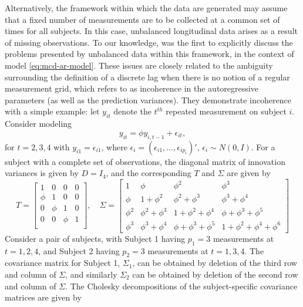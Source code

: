 Alternatively, the framework within which the data are generated may assume that a fixed number of measurements are to be collected at a common set of times for all subjects. In this case, unbalanced longitudinal data arises as a result of missing observations. To our knowledge, \cite{huang2012cautionary} was the first to explicitly discuss the problems presented by unbalanced data within this framework, in the context of model \eqref{eq:mcd-ar-model}. These issues are closely related to the ambiguity surrounding the definition of a discrete lag when there is no notion of a regular measurement grid, which \cite{huang2012cautionary} refers to as incoherence in the autoregressive parameters (as well as the prediction variances). They demonstrate incoherence with a simple example: let $y_{it}$ denote the $t^{th}$ repeated measurement on subject $i$. Consider modeling 
\begin{equation}
y_{it} = \phi y_{i,t-1} + \epsilon_{it},
\end{equation}
\noindent
for $t = 2,3,4$ with $y_{i1} = \epsilon_{i1}$, where $\epsilon_i = \left(\epsilon_{i1}, \dots, \epsilon_{ip_i} \right)'$, $\epsilon_i \sim N\left(0, I\right)$. For a subject with a complete set of observations, the diagonal matrix of innovation variances is given by $D = I_4$, and the corresponding $T$ and $\Sigma$ are given by 
\[
T = \begin{bmatrix}
1& 0 & 0 & 0  \\
\phi & 1& 0 & 0 \\
0 & \phi & 1& 0 \\
0 & 0 & \phi & 1\\
\end{bmatrix}, \quad
\Sigma = \begin{bmatrix} 
1 & \phi & \phi^2 & \phi^3 \\
\phi & 1 + \phi^2  & \phi^2 + \phi^3 &  \phi^3 + \phi^4 \\
\phi^2 & \phi^2 + \phi^3 & 1 + \phi^2 + \phi^4 & \phi + \phi^3 + \phi^5 \\
\phi^3 & \phi^3 + \phi^4 & \phi + \phi^3 + \phi^5 & 1 + \phi^2 + \phi^4 + \phi^6 
\end{bmatrix}
\]
Consider a pair of subjects, with Subject 1 having $p_1 = 3$ measurements at $t = 1, 2, 4$, and Subject 2 having $p_2 = 3$ measurements at $t = 1, 3, 4$. The covariance matrix for Subject 1, $\Sigma_1$, can be obtained by deletion of the third row and column of $\Sigma$, and similarly $\Sigma_2$ can be obtained by deletion of the second row and column of $\Sigma$. The Cholesky decompositions of the subject-specific covariance matrices are given by 
